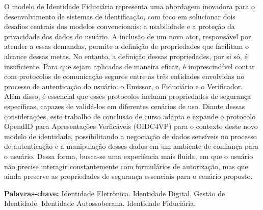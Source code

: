 \documentclass[embeddedlogo, nohidelinks, arial]{ufsc-thesis-rn46-2019}
\theoremstyle{definition}
\begin{document}
\begin{resumo}[Resumo]
O modelo de Identidade Fiduciária representa uma abordagem inovadora para o desenvolvimento de sistemas de identificação, com foco em solucionar dois desafios centrais dos modelos convencionais: a usabilidade e a proteção da privacidade dos dados do usuário. A inclusão de um novo ator, responsável por atender a essas demandas, permite a definição de propriedades que facilitam o alcance dessas metas. No entanto, a definição dessas propriedades, por si só, é insuficiente. Para que sejam aplicadas de maneira eficaz, é imprescindível contar com protocolos de comunicação seguros entre as três entidades envolvidas no processo de autenticação do usuário: o Emissor, o Fiduciário e o Verificador. Além disso, é essencial que esses protocolos incluam propriedades de segurança específicas, capazes de validá-los em diferentes cenários de uso.
Diante dessas considerações, este trabalho de conclusão de curso adapta e expande o protocolo OpendID para Apresentações Verficáveis (\acs{OIDC4VP}) para o contexto deste novo modelo de identidade, possibilitando a negociação de dados sensíveis no processo de autenticação e a manipulação desses dados em um ambiente de confiança para o usuário. Dessa forma, busca-se uma experiência mais fluida, em que o usuário não precise interagir constantemente com formulários de autorização, mas que ainda preserve as propriedades de segurança essenciais para o cenário proposto.

  \vspace{\baselineskip} 
  \textbf{Palavras-chave:} Identidade Eletrônica.  Identidade Digital. Gestão de Identidade. Identidade Autossoberana. Identidade Fiduciária.

\end{resumo}


    
        
\end{document}
